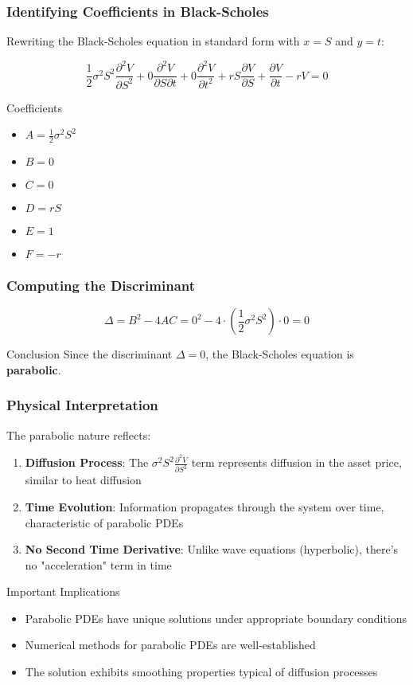\documentclass{beamer}
\begin{document}
\begin{frame}
\frametitle{Identifying Coefficients in Black-Scholes}
Rewriting the Black-Scholes equation in standard form with $x = S$ and $y = t$:

$$\frac{1}{2}\sigma^2 S^2 \frac{\partial^2 V}{\partial S^2} + 0 \frac{\partial^2 V}{\partial S \partial t} + 0 \frac{\partial^2 V}{\partial t^2} + rS \frac{\partial V}{\partial S} + \frac{\partial V}{\partial t} - rV = 0$$

\begin{block}{Coefficients}
\begin{itemize}
\item $A = \frac{1}{2}\sigma^2 S^2$
\item $B = 0$
\item $C = 0$
\item $D = rS$
\item $E = 1$
\item $F = -r$
\end{itemize}
\end{block}
\end{frame}

\begin{frame}
\frametitle{Computing the Discriminant}
$$\Delta = B^2 - 4AC = 0^2 - 4 \cdot \left(\frac{1}{2}\sigma^2 S^2\right) \cdot 0 = 0 $$

\begin{block}{Conclusion}
Since the discriminant $\Delta = 0$, the Black-Scholes equation is \textbf{parabolic}.
\end{block}
\end{frame}

\begin{frame}
\frametitle{Physical Interpretation}
The parabolic nature reflects:

\begin{enumerate}
\item \textbf{Diffusion Process}: The $\sigma^2 S^2 \frac{\partial^2 V}{\partial S^2}$ term represents diffusion in the asset price, similar to heat diffusion

\item \textbf{Time Evolution}: Information propagates through the system over time, characteristic of parabolic PDEs

\item \textbf{No Second Time Derivative}: Unlike wave equations (hyperbolic), there's no "acceleration" term in time
\end{enumerate}

\begin{block}{Important Implications}
\begin{itemize}
\item Parabolic PDEs have unique solutions under appropriate boundary conditions
\item Numerical methods for parabolic PDEs are well-established
\item The solution exhibits smoothing properties typical of diffusion processes
\end{itemize}
\end{block}
\end{frame}
\end{document}
